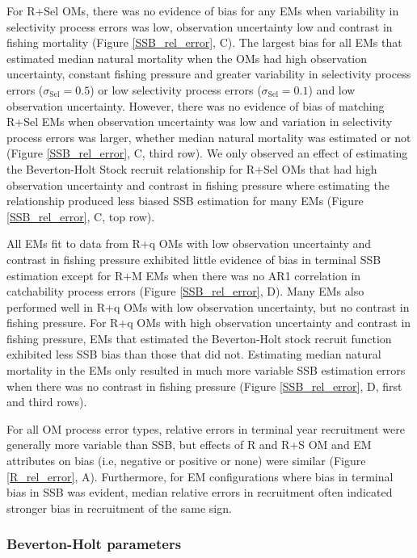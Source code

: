 \documentclass[
  12pt,
]{article}
\begin{document}
For R+Sel OMs, there was no evidence of bias for any EMs when
variability in selectivity process errors was low, observation
uncertainty low and contrast in fishing mortality (Figure
\ref{SSB_rel_error}, C). The largest bias for all EMs that estimated
median natural mortality when the OMs had high observation uncertainty,
constant fishing pressure and greater variability in selectivity process
errors (\(\sigma_{\text{Sel}} = 0.5\)) or low selectivity process errors
(\(\sigma_{\text{Sel}} = 0.1\)) and low observation uncertainty.
However, there was no evidence of bias of matching R+Sel EMs when
observation uncertainty was low and variation in selectivity process
errors was larger, whether median natural mortality was estimated or not
(Figure \ref{SSB_rel_error}, C, third row). We only observed an effect
of estimating the Beverton-Holt Stock recruit relationship for R+Sel OMs
that had high observation uncertainty and contrast in fishing pressure
where estimating the relationship produced less biased SSB estimation
for many EMs (Figure \ref{SSB_rel_error}, C, top row).

All EMs fit to data from R+q OMs with low observation uncertainty and
contrast in fishing pressure exhibited little evidence of bias in
terminal SSB estimation except for R+M EMs when there was no AR1
correlation in catchability process errors (Figure \ref{SSB_rel_error},
D). Many EMs also performed well in R+q OMs with low observation
uncertainty, but no contrast in fishing pressure. For R+q OMs with high
observation uncertainty and contrast in fishing pressure, EMs that
estimated the Beverton-Holt stock recruit function exhibited less SSB
bias than those that did not. Estimating median natural mortality in the
EMs only resulted in much more variable SSB estimation errors when there
was no contrast in fishing pressure (Figure \ref{SSB_rel_error}, D,
first and third rows).

For all OM process error types, relative errors in terminal year
recruitment were generally more variable than SSB, but effects of R and
R+S OM and EM attributes on bias (i.e, negative or positive or none)
were similar (Figure \ref{R_rel_error}, A). Furthermore, for EM
configurations where bias in terminal bias in SSB was evident, median
relative errors in recruitment often indicated stronger bias in
recruitment of the same sign.

\hypertarget{beverton-holt-parameters}{%
\subsubsection*{Beverton-Holt
parameters}\label{beverton-holt-parameters}}
\end{document}
